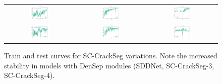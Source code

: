 \documentclass[a4paper,12pt]{report}
\begin{document}
\begin{figure}[htbp]
    \begin{tabular}{ccc}
        \includegraphics[width=0.3\textwidth]{res/crack-experiments-training-curves/sc-crackseg.pdf}   & \includegraphics[width=0.3\textwidth]{res/crack-experiments-training-curves/sddnet.pdf}        & \includegraphics[width=0.3\textwidth]{res/crack-experiments-training-curves/scmnet.pdf} \\
        \includegraphics[width=0.3\textwidth]{res/crack-experiments-training-curves/sc-crackseg-2.pdf} & \includegraphics[width=0.3\textwidth]{res/crack-experiments-training-curves/sc-crackseg-3.pdf} & \includegraphics[width=0.3\textwidth]{res/crack-experiments-training-curves/sc-crackseg-4.pdf} \\
    \end{tabular}
    \caption{Train and test curves for SC-CrackSeg variations. Note the increased stability in models with DenSep modules (SDDNet, SC-CrackSeg-3, SC-CrackSeg-4).}
\end{figure}
\end{document}

